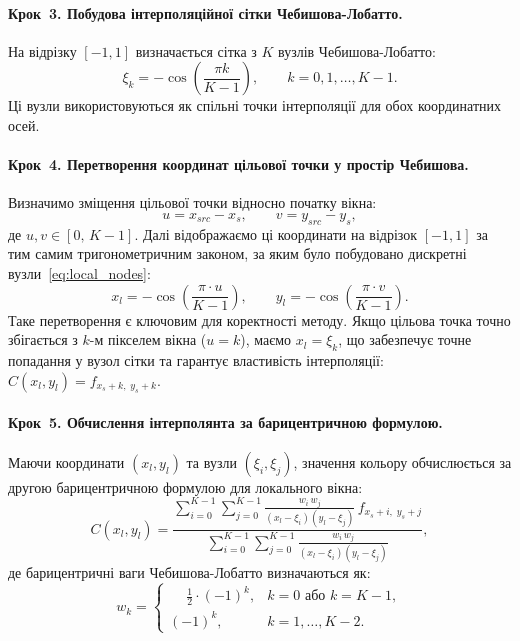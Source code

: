 \paragraph{Крок~3. Побудова інтерполяційної сітки Чебишова-Лобатто.}
На відрізку $[-1, 1]$ визначається сітка з $K$ вузлів
Чебишова-Лобатто:
\begin{equation}
	\xi_k = -\cos\!\left(\frac{\pi k}{K - 1}\right), \qquad
	k = 0, 1, \ldots, K{-}1.
	\label{eq:local_nodes}
\end{equation}
Ці вузли використовуються як спільні точки інтерполяції для обох
координатних осей.

\paragraph{Крок~4. Перетворення координат цільової точки у простір
	Чебишова.}
Визначимо зміщення цільової точки відносно початку вікна:
\begin{equation}
	u = x_{src} - x_s, \qquad v = y_{src} - y_s,
	\label{eq:uv}
\end{equation}
де $u, v \in [0,\, K{-}1]$. Далі відображаємо ці координати на відрізок
$[-1, 1]$ за тим самим тригонометричним законом, за яким було побудовано
дискретні вузли~\eqref{eq:local_nodes}:
\begin{equation}
	x_l = -\cos\!\left(\frac{\pi \cdot u}{K - 1}\right), \qquad
	y_l = -\cos\!\left(\frac{\pi \cdot v}{K - 1}\right).
	\label{eq:local_xy}
\end{equation}
Таке перетворення є ключовим для коректності методу. Якщо цільова точка
точно збігається з $k$-м пікселем вікна ($u = k$), маємо
$x_l = \xi_k$, що забезпечує точне попадання у вузол сітки та
гарантує властивість інтерполяції: $C(x_l, y_l) = f_{x_s+k,\; y_s+k}$.

\paragraph{Крок~5. Обчислення інтерполянта за барицентричною формулою.}
Маючи координати $(x_l, y_l)$ та вузли $(\xi_i, \xi_j)$, значення кольору
обчислюється за другою барицентричною формулою для локального вікна:
\begin{equation}
	C(x_l, y_l) = \frac{
		\displaystyle\sum_{i=0}^{K-1}\sum_{j=0}^{K-1}
		\frac{w_i\, w_j}{(x_l - \xi_i)(y_l - \xi_j)}\,
		f_{x_s+i,\; y_s+j}
	}{
		\displaystyle\sum_{i=0}^{K-1}\sum_{j=0}^{K-1}
		\frac{w_i\, w_j}{(x_l - \xi_i)(y_l - \xi_j)}
	},
	\label{eq:local_bary}
\end{equation}
де барицентричні ваги Чебишова-Лобатто визначаються як:
\begin{equation}
	w_k = \begin{cases}
		\phantom{-}\tfrac{1}{2}\cdot(-1)^k, & k = 0 \text{ або } k = K{-}1, \\[4pt]
		(-1)^k,                              & k = 1, \ldots, K{-}2.
	\end{cases}
	\label{eq:local_weights}
\end{equation}

